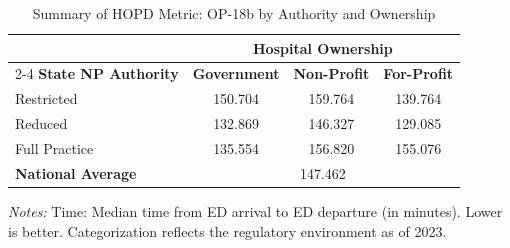 \begin{table}[htbp]
    \centering
    \caption{Summary of HOPD Metric: OP-18b by Authority and Ownership}
    \label{tab:hopd_op_18b_own}
    \vspace{0.2cm}
    \begin{tabular}{lccc}
        \toprule
        & \multicolumn{3}{c}{\textbf{Hospital Ownership}} \\
        \cmidrule(lr){2-4}
        \textbf{State NP Authority} & \textbf{Government} & \textbf{Non-Profit} & \textbf{For-Profit} \\
        \midrule
        Restricted & 150.704 & 159.764 & 139.764 \\
        Reduced & 132.869 & 146.327 & 129.085 \\
        Full Practice & 135.554 & 156.820 & 155.076 \\
        \midrule
        \textbf{National Average} & \multicolumn{3}{c}{147.462} \\
        \bottomrule
    \end{tabular}
    \vspace{0.1cm}
    \begin{minipage}{0.85\textwidth}
        \footnotesize \textit{Notes:} Time: Median time from ED arrival to ED departure (in minutes). Lower is better. Categorization reflects the regulatory environment as of 2023.
    \end{minipage}
\end{table}